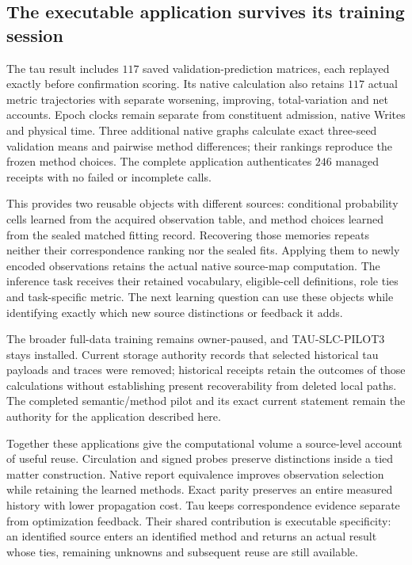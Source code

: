 \subsection{The executable application survives its training session}

The tau result includes $117$ saved validation-prediction matrices, each replayed exactly before confirmation scoring. Its native calculation also retains $117$ actual metric trajectories with separate worsening, improving, total-variation and net accounts. Epoch clocks remain separate from constituent admission, native Writes and physical time. Three additional native graphs calculate exact three-seed validation means and pairwise method differences; their rankings reproduce the frozen method choices. The complete application authenticates $246$ managed receipts with no failed or incomplete calls. 

This provides two reusable objects with different sources: conditional probability cells learned from the acquired observation table, and method choices learned from the sealed matched fitting record. Recovering those memories repeats neither their correspondence ranking nor the sealed fits. Applying them to newly encoded observations retains the actual native source-map computation. The inference task receives their retained vocabulary, eligible-cell definitions, role ties and task-specific metric. The next learning question can use these objects while identifying exactly which new source distinctions or feedback it adds.

The broader full-data training remains owner-paused, and TAU-SLC-PILOT3 stays installed. Current storage authority records that selected historical tau payloads and traces were removed; historical receipts retain the outcomes of those calculations without establishing present recoverability from deleted local paths. The completed semantic/method pilot and its exact current statement remain the authority for the application described here. 

Together these applications give the computational volume a source-level account of useful reuse. Circulation and signed probes preserve distinctions inside a tied matter construction. Native report equivalence improves observation selection while retaining the learned methods. Exact parity preserves an entire measured history with lower propagation cost. Tau keeps correspondence evidence separate from optimization feedback. Their shared contribution is executable specificity: an identified source enters an identified method and returns an actual result whose ties, remaining unknowns and subsequent reuse are still available.
